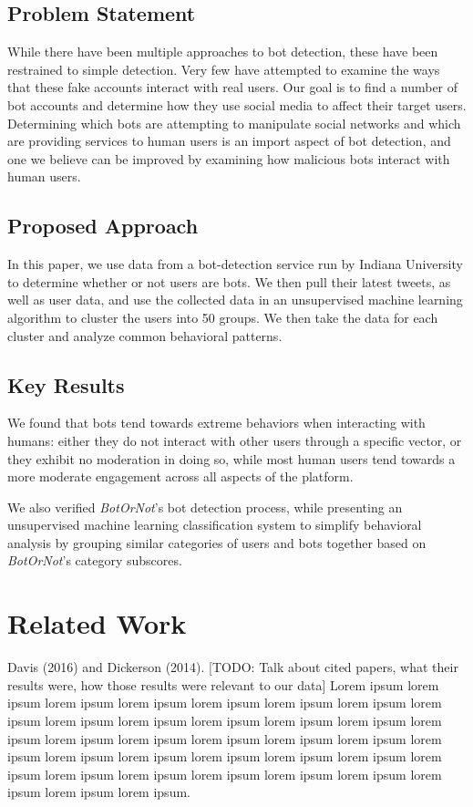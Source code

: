 \documentclass{sig-alternate-05-2015}
\begin{document}
\subsection{Problem Statement}
While there have been multiple approaches to bot detection\cite{Stringhini:DetectSpam}\cite{Xiao:ClusterFakeAccounts}\cite{Chu:DetectAutomation}, these have been restrained to simple detection. Very few have attempted to examine the ways that these fake accounts interact with real users. Our goal is to find a number of bot accounts and determine how they use social media to affect their target users. Determining which bots are attempting to manipulate social networks and which are providing services to human users is an import aspect of bot detection, and one we believe can be improved by examining how malicious bots interact with human users.

\subsection{Proposed Approach}
In this paper, we use data from a bot-detection service run by Indiana University to determine whether or not users are bots. We then pull their latest tweets, as well as user data, and use the collected data in an unsupervised machine learning algorithm to cluster the users into 50 groups. We then take the data for each cluster and analyze common behavioral patterns.

\subsection{Key Results}
We found that bots tend towards extreme behaviors when interacting with humans: either they do not interact with other users through a specific vector, or they exhibit no moderation in doing so, while most human users tend towards a more moderate engagement across all aspects of the platform.

We also verified \emph{BotOrNot}'s bot detection process, while presenting an unsupervised machine learning classification system to simplify behavioral analysis by grouping similar categories of users and bots together based on \emph{BotOrNot}'s category subscores.

\section{Related Work}
Davis (2016)\cite{Davis:BotOrNot} and Dickerson (2014)\cite{Dickerson:Sentiment}. [TODO: Talk about cited papers, what their results were, how those results were relevant to our data] Lorem ipsum lorem ipsum lorem ipsum lorem ipsum lorem ipsum lorem ipsum lorem ipsum lorem ipsum lorem ipsum lorem ipsum lorem ipsum lorem ipsum lorem ipsum lorem ipsum lorem ipsum lorem ipsum lorem ipsum lorem ipsum lorem ipsum lorem ipsum lorem ipsum lorem ipsum lorem ipsum lorem ipsum lorem ipsum lorem ipsum lorem ipsum lorem ipsum lorem ipsum lorem ipsum lorem ipsum lorem ipsum lorem ipsum lorem ipsum.
\end{document}
